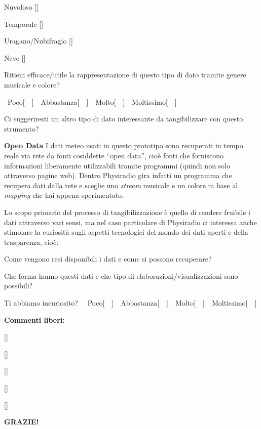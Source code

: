 \documentclass[12pt,a4paper]{report}
\begin{document}
\begin{mdframed}[leftmargin=-40pt,rightmargin=-40pt]
\begin{compactenum}
\begin{compactitem}
	\item Nuvoloso [\dotfill]
	
	\item Temporale [\dotfill]
	
	\item Uragano/Nubifragio [\dotfill]
	
	
	\item Neve [\dotfill]
	

\end{compactitem}
	
	\item Ritieni efficace/utile la rappresentazione di questo tipo di dato tramite genere musicale e colore?
	
	~Poco[~~]~~Abbastanza[~~]~~Molto[~~]~~Moltissimo[~~]
	
	
	\item Ci suggeriresti un altro tipo di dato interessante da tangibilizzare con questo strumento?\newline
	[\dotfill]\newline
	[\dotfill]
	
	
	\item \textbf{Open Data}\newline
	I dati meteo usati in questo prototipo sono recuperati in tempo reale via rete da fonti cosiddette ``open data'', cioè fonti che forniscono informazioni liberamente utilizzabili tramite programmi (quindi non solo attraverso pagine web). Dentro Physiradio gira infatti un programma che recupera dati dalla rete e sceglie uno \textit{stream} musicale e un colore in base al \textit{mapping} che hai appena sperimentato.
	
	Lo scopo primario del processo di tangibilizzazione è quello di rendere fruibile i dati attraverso vari sensi, ma nel caso particolare di Physiradio ci interessa anche stimolare la curiosità sugli aspetti tecnologici del mondo dei dati aperti e della trasparenza, cioè:
	\begin{compactitem}
		\item Come vengono resi disponibili i dati e come si possono recuperare?
		\item Che forma hanno questi dati e che tipo di elaborazioni/visualizzazioni sono possibili?
	\end{compactitem}
	Ti abbiamo incuriosito?
	~~Poco[~~]~~Abbastanza[~~]~~Molto[~~]~~Moltissimo[~~]

\end{compactenum}

\hrulefill

\textbf{Commenti liberi:}

[\dotfill]

[\dotfill]

[\dotfill]

[\dotfill]

[\dotfill]

\hrulefill

\textbf{GRAZIE!}


\end{mdframed}
\end{document}
